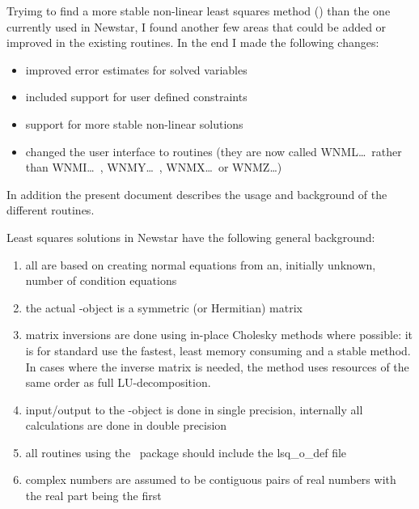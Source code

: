Tryimg to find a more stable non-linear least squares method (\LSQ) than the
one currently used in Newstar, I found another few areas that could be added
or improved in the existing routines. In the end I made the following
changes:
\begin{itemize}
\item improved error estimates for solved variables \Mn
\item included support for user defined constraints \Mn
\item support for more stable non-linear solutions \Mn
\item changed the user interface to routines (they are now called WNML\ldots\
rather than WNMI\ldots\ , WNMY\ldots\ , WNMX\ldots\  or WNMZ\ldots) \Mn
\end{itemize}
In addition the present document describes the usage and background of the
different routines.

Least squares solutions in Newstar have the following general
background:
\begin{enumerate}
\item all are based on creating normal equations from an, initially unknown,
number of condition equations \Mn
\item the actual \LSQ-object is a symmetric (or Hermitian) matrix \Mn
\item matrix inversions are done using in-place Cholesky methods where
possible: it is for
standard use the fastest, least memory consuming and a stable method. In cases
where the inverse matrix is needed, the method uses resources of the same
order as full LU-decomposition. \Mn
\item input/output to the \LSQ-object is done in single precision, internally
all calculations are done in double precision \Mn
\item all routines using the \LSQ\ package should include the
{{\sc lsq}\_{\sc o}\_{\sc def}} file \Mn
\item complex numbers are assumed to be contiguous pairs of real numbers with
the real part being the first \Mn
\end{enumerate}

